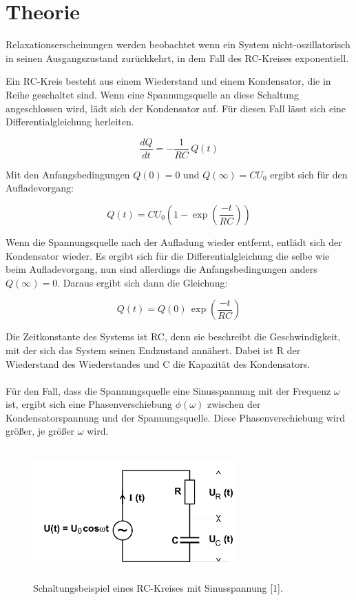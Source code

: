 \section{Theorie}


Relaxationserscheinungen werden beobachtet wenn ein System nicht-oszillatorisch
in seinen Ausgangszustand zurückkehrt, in dem Fall des RC-Kreises exponentiell.

Ein RC-Kreis besteht aus einem Wiederstand und einem Kondensator, die in Reihe
geschaltet sind. Wenn eine Spannungsquelle an diese Schaltung angeschlossen wird,
lädt sich der Kondensator auf. Für diesen Fall lässt sich eine Differentialgleichung
herleiten.

\begin{equation}
  \frac{dQ}{dt} = -\frac{1}{RC}\, Q(t)
\end{equation}

Mit den Anfangsbedingungen $Q(0)=0$ und $Q(\infty)= CU_0$ ergibt sich für den Aufladevorgang:

\begin{equation}
  Q(t) = CU_0 \left(1 - \exp\left(\frac{-t}{RC}\right)\right)
\end{equation}

Wenn die Spannungsquelle nach der Aufladung wieder entfernt, entlädt sich der Kondensator
wieder. Es ergibt sich für die Differentialgleichung die selbe wie beim Aufladevorgang,
nun sind allerdings die Anfangsbedingungen anders $Q(\infty) = 0$. Daraus ergibt sich dann
die Gleichung:

\begin{equation}
  Q(t) = Q(0)\, \exp\left(\frac{-t}{RC}\right)
  \label{eq:1}
\end{equation}

Die Zeitkonstante des Systems ist RC, denn sie beschreibt die Geschwindigkeit, mit
der sich das System seinen Endzustand annähert. Dabei ist R der Wiederstand des Wiederstandes
und C die Kapazität des Kondensators.\\\\

Für den Fall, dass die Spannungsquelle eine Sinusspannung mit der Frequenz $\omega$
ist, ergibt sich eine Phasenverschiebung $\phi(\omega)$ zwischen der Kondensatorspannung
und der Spannungsquelle. Diese Phasenverschiebung wird größer, je größer $\omega$ wird.

\begin{figure}
  \centering
  \includegraphics[height=5cm, width=0.7\textwidth]{Schaltungsbeispiel.png}
  \caption{Schaltungsbeispiel eines RC-Kreises mit Sinusspannung [1].}
\end{figure}

